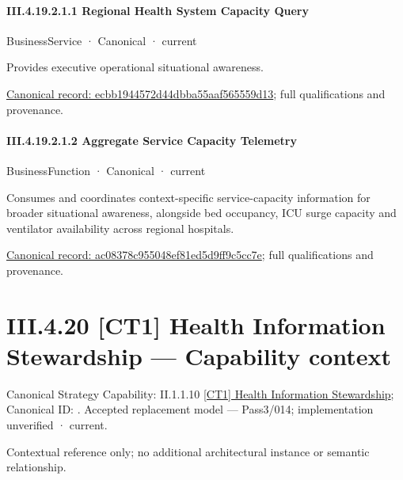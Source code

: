 \paragraph*{III.4.19.2.1.1 Regional Health System Capacity Query}
\label{navigation:III.4.19.2.1.1}

\label{element:ecbb1944572d44dbba55aaf565559d13}
{\small BusinessService · Canonical · current}\par

Provides executive operational situational awareness.


{\footnotesize \href{../../../../../../../../continuum/business/business-service/ecbb1944572d44dbba55aaf565559d13.md}{Canonical record: ecbb1944572d44dbba55aaf565559d13}; full qualifications and provenance.}\par
\paragraph*{III.4.19.2.1.2 Aggregate Service Capacity Telemetry}
\label{navigation:III.4.19.2.1.2}

\label{element:ac08378c955048ef81ed5d9ff9c5cc7e}
{\small BusinessFunction · Canonical · current}\par

Consumes and coordinates context-specific service-capacity information for broader situational awareness, alongside bed occupancy, ICU surge capacity and ventilator availability across regional hospitals.


{\footnotesize \href{../../../../../../../../continuum/business/business-function/ac08378c955048ef81ed5d9ff9c5cc7e.md}{Canonical record: ac08378c955048ef81ed5d9ff9c5cc7e}; full qualifications and provenance.}\par
\section*{III.4.20 [CT1] Health Information Stewardship — Capability context}
\label{navigation:III.4.20}

{\small Canonical Strategy Capability: II.1.1.10 \hyperref[element:3ed66006b3424bc086180c6738b1596d]{[CT1] Health Information Stewardship}; Canonical ID: \texttt{}. Accepted replacement model — Pass3/014; implementation unverified · current.}\par
Contextual reference only; no additional architectural instance or semantic relationship.\par
